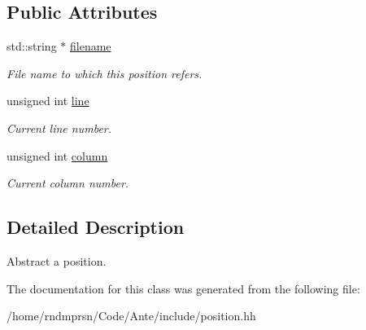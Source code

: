 \subsection*{Public Attributes}
\begin{DoxyCompactItemize}
\item 
\mbox{\label{classyy_1_1position_a88d2d070ec4751e5d5b1999bb2dc2116}} 
std\+::string $\ast$ \hyperlink{classyy_1_1position_a88d2d070ec4751e5d5b1999bb2dc2116}{filename}
\begin{DoxyCompactList}\small\item\em File name to which this position refers. \end{DoxyCompactList}\item 
\mbox{\label{classyy_1_1position_aa3806654fd62786a0446a461d55755d6}} 
unsigned int \hyperlink{classyy_1_1position_aa3806654fd62786a0446a461d55755d6}{line}
\begin{DoxyCompactList}\small\item\em Current line number. \end{DoxyCompactList}\item 
\mbox{\label{classyy_1_1position_ada60c2dbba2e05705265f8359f722c4f}} 
unsigned int \hyperlink{classyy_1_1position_ada60c2dbba2e05705265f8359f722c4f}{column}
\begin{DoxyCompactList}\small\item\em Current column number. \end{DoxyCompactList}\end{DoxyCompactItemize}


\subsection{Detailed Description}
Abstract a position. 

The documentation for this class was generated from the following file\+:\begin{DoxyCompactItemize}
\item 
/home/rndmprsn/\+Code/\+Ante/include/position.\+hh\end{DoxyCompactItemize}
